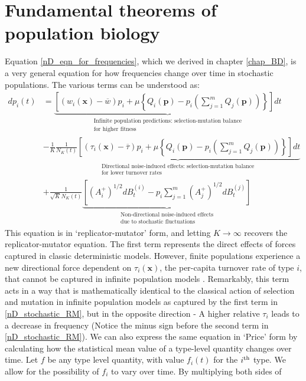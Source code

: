 \section{Fundamental theorems of population biology}
Equation \eqref{nD_eqn_for_frequencies}, which we derived in chapter \ref{chap_BD}, is a very general equation for how frequencies change over time in stochastic populations. The various terms can be understood as:
\begin{equation}
\label{nD_stochastic_RM}
\begin{aligned}
dp_i(t) &= \underbrace{\left[(w_i(\mathbf{x}) - \overline{w})p_i + \mu\left\{Q_i(\mathbf{p}) - p_i\left(\sum\limits_{j=1}^{m}Q_j(\mathbf{p})\right)\right\}\right]dt}_{\substack{\text{Infinite population predictions: selection-mutation balance} \\ \text{for higher fitness}}}\\
&- \frac{1}{K}\underbrace{\frac{1}{N_{K}(t)}\left[(\tau_i(\mathbf{x}) - \overline{\tau})p_i + \mu\left\{Q_i(\mathbf{p}) - p_i\left(\sum\limits_{j=1}^{m}Q_j(\mathbf{p})\right)\right\}\right]dt}_{\substack{\text{Directional noise-induced effects: selection-mutation balance}\\\text{for lower turnover rates}}}\\
&+ \frac{1}{\sqrt{K}N_{K}(t)}\underbrace{\left[\left(A^{+}_{i}\right)^{1/2}dB^{(i)}_t - p_i\sum\limits_{j=1}^{m}\left(A^{+}_{j}\right)^{1/2}dB^{(j)}_t\right]}_{\substack{\text{Non-directional noise-induced effects}\\\text{due to stochastic fluctuations}}}
\end{aligned}
\end{equation}
This equation is in `replicator-mutator' form, and letting $K \to \infty$ recovers the replicator-mutator equation. The first term represents the direct effects of forces captured in classic deterministic models. However, finite populations experience a new directional force dependent on $\tau_i(\mathbf{x})$, the per-capita turnover rate of type $i$, that cannot be captured in infinite population models \citep{kuosmanen_turnover_2022}. Remarkably, this term acts in a way that is mathematically identical to the classical action of selection and mutation in infinite population models as captured by the first term in \eqref{nD_stochastic_RM}, but in the opposite direction - A higher relative $\tau_i$ leads to a decrease in frequency (Notice the minus sign before the second term in \eqref{nD_stochastic_RM}). We can also express the same equation in `Price' form by calculating how the statistical mean value of a type-level quantity changes over time. Let $f$ be any type level quantity, with value $f_i(t)$ for the $i\textsuperscript{th}$ type. We allow for the possibility of $f_i$ to vary over time. By multiplying both sides of
